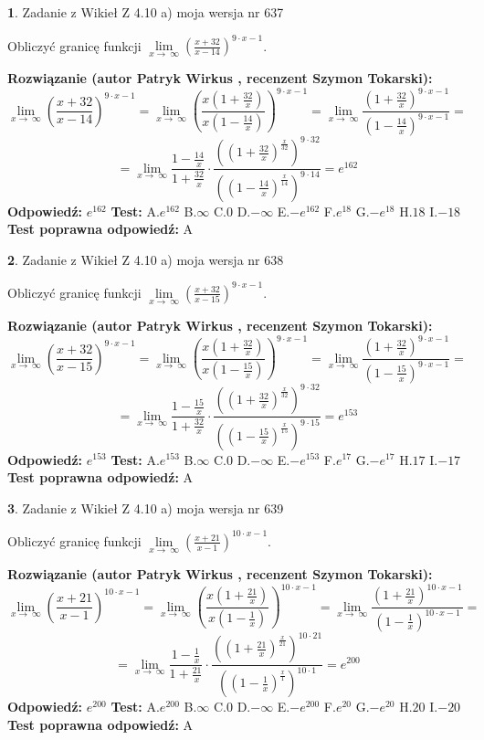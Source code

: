 \documentclass[12pt, a4paper]{article}
\theoremstyle{definition} %
\newtheorem{zad}{}
\newcommand{\zadStart}[1]{\begin{zad}#1\newline}
\newcommand{\zadStop}{\end{zad}}
\newcommand{\rozwStart}[2]{\noindent \textbf{Rozwiązanie (autor #1 , recenzent #2): }\newline}
\newcommand{\rozwStop}{\newline}
\newcommand{\odpStart}{\noindent \textbf{Odpowiedź:}\newline}
\newcommand{\odpStop}{\newline}
\newcommand{\testStart}{\noindent \textbf{Test:}\newline}
\newcommand{\testStop}{\newline}
\newcommand{\kluczStart}{\noindent \textbf{Test poprawna odpowiedź:}\newline}
\newcommand{\kluczStop}{\newline}
\begin{document}
\zadStart{Zadanie z Wikieł Z 4.10 a) moja wersja nr 637}

Obliczyć granicę funkcji  $\lim\limits_{x\to\ \infty}(\frac{x+32}{x-14})^{9\cdot x-1}$.
\zadStop
\rozwStart{Patryk Wirkus}{Szymon Tokarski}
$$\lim\limits_{x\to\ \infty}(\frac{x+32}{x-14})^{9\cdot x-1} = \lim\limits_{x\to\ \infty}(\frac{x(1+\frac{32}{x})}{x(1-\frac{14}{x})})^{9\cdot x-1}=\lim\limits_{x\to\ \infty}\frac{(1+\frac{32}{x})^{9\cdot x-1}}{(1-\frac{14}{x})^{9\cdot x-1}}=$$
$$=\lim\limits_{x\to\ \infty}\frac{1-\frac{14}{x}}{1+\frac{32}{x}}\cdot\frac{((1+\frac{32}{x})^{\frac{x}{32}})^{9\cdot32}}{((1-\frac{14}{x})^{\frac{x}{14}})^{9\cdot14}}=e^{162}$$
\rozwStop
\odpStart
$e^{162}$
\odpStop
\testStart
A.$e^{162}$ B.$\infty$ C.$0$ D.$-\infty$ E.$-e^{162}$
F.$e^{18}$ G.$-e^{18}$
H.$18$
I.$-18$
\testStop
\kluczStart
A
\kluczStop



\zadStart{Zadanie z Wikieł Z 4.10 a) moja wersja nr 638}

Obliczyć granicę funkcji  $\lim\limits_{x\to\ \infty}(\frac{x+32}{x-15})^{9\cdot x-1}$.
\zadStop
\rozwStart{Patryk Wirkus}{Szymon Tokarski}
$$\lim\limits_{x\to\ \infty}(\frac{x+32}{x-15})^{9\cdot x-1} = \lim\limits_{x\to\ \infty}(\frac{x(1+\frac{32}{x})}{x(1-\frac{15}{x})})^{9\cdot x-1}=\lim\limits_{x\to\ \infty}\frac{(1+\frac{32}{x})^{9\cdot x-1}}{(1-\frac{15}{x})^{9\cdot x-1}}=$$
$$=\lim\limits_{x\to\ \infty}\frac{1-\frac{15}{x}}{1+\frac{32}{x}}\cdot\frac{((1+\frac{32}{x})^{\frac{x}{32}})^{9\cdot32}}{((1-\frac{15}{x})^{\frac{x}{15}})^{9\cdot15}}=e^{153}$$
\rozwStop
\odpStart
$e^{153}$
\odpStop
\testStart
A.$e^{153}$ B.$\infty$ C.$0$ D.$-\infty$ E.$-e^{153}$
F.$e^{17}$ G.$-e^{17}$
H.$17$
I.$-17$
\testStop
\kluczStart
A
\kluczStop



\zadStart{Zadanie z Wikieł Z 4.10 a) moja wersja nr 639}

Obliczyć granicę funkcji  $\lim\limits_{x\to\ \infty}(\frac{x+21}{x-1})^{10\cdot x-1}$.
\zadStop
\rozwStart{Patryk Wirkus}{Szymon Tokarski}
$$\lim\limits_{x\to\ \infty}(\frac{x+21}{x-1})^{10\cdot x-1} = \lim\limits_{x\to\ \infty}(\frac{x(1+\frac{21}{x})}{x(1-\frac{1}{x})})^{10\cdot x-1}=\lim\limits_{x\to\ \infty}\frac{(1+\frac{21}{x})^{10\cdot x-1}}{(1-\frac{1}{x})^{10\cdot x-1}}=$$
$$=\lim\limits_{x\to\ \infty}\frac{1-\frac{1}{x}}{1+\frac{21}{x}}\cdot\frac{((1+\frac{21}{x})^{\frac{x}{21}})^{10\cdot21}}{((1-\frac{1}{x})^{\frac{x}{1}})^{10\cdot1}}=e^{200}$$
\rozwStop
\odpStart
$e^{200}$
\odpStop
\testStart
A.$e^{200}$ B.$\infty$ C.$0$ D.$-\infty$ E.$-e^{200}$
F.$e^{20}$ G.$-e^{20}$
H.$20$
I.$-20$
\testStop
\kluczStart
A
\kluczStop
\end{document}
